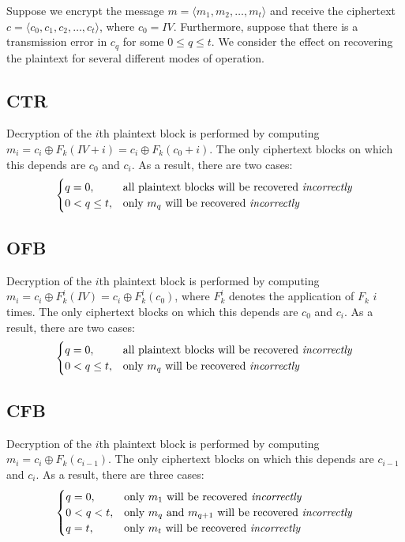 \documentclass[12pt]{article}
\numberwithin{equation}{section}
\theoremstyle{plain}
\begin{document}
Suppose we encrypt the message $m = \langle m_1, m_2, \ldots, m_t \rangle$
and receive the ciphertext $c = \langle c_0, c_1, c_2, \ldots, c_t \rangle$,
where $c_0 = IV$.
Furthermore, suppose that there is a transmission error in $c_q$
for some $0 \leq q \leq t$.
We consider the effect on recovering the plaintext for several different modes of operation.

\subsection*{CTR}

Decryption of the $i$th plaintext block is performed by computing $m_i = c_i \oplus F_k(IV + i) = c_i \oplus F_k(c_0 + i)$.
The only ciphertext blocks on which this depends are $c_0$ and $c_i$.
As a result, there are two cases:
\begin{equation*}
\begin{cases}
q = 0, &\text{all plaintext blocks will be recovered \textit{incorrectly}}\\
0 < q \leq t, &\text{only }m_q\text{ will be recovered \textit{incorrectly}}
\end{cases}
\end{equation*}

\subsection*{OFB}

Decryption of the $i$th plaintext block is performed by computing $m_i = c_i \oplus F_k^i(IV) = c_i \oplus F_k^i(c_0)$,
where $F_k^i$ denotes the application of $F_k$ $i$ times.
The only ciphertext blocks on which this depends are $c_0$ and $c_i$.
As a result, there are two cases:
\begin{equation*}
\begin{cases}
q = 0, &\text{all plaintext blocks will be recovered \textit{incorrectly}}\\
0 < q \leq t, &\text{only }m_q\text{ will be recovered \textit{incorrectly}}
\end{cases}
\end{equation*}

\subsection*{CFB}

Decryption of the $i$th plaintext block is performed by computing $m_i = c_i \oplus F_k(c_{i-1})$.
The only ciphertext blocks on which this depends are $c_{i-1}$ and $c_i$.
As a result, there are three cases:
\begin{equation*}
\begin{cases}
q = 0, &\text{only }m_1\text{ will be recovered \textit{incorrectly}}\\
0 < q < t, &\text{only }m_q\text{ and }m_{q+1}\text{ will be recovered \textit{incorrectly}}\\
q = t, &\text{only }m_t\text{ will be recovered \textit{incorrectly}}
\end{cases}
\end{equation*}
\end{document}
